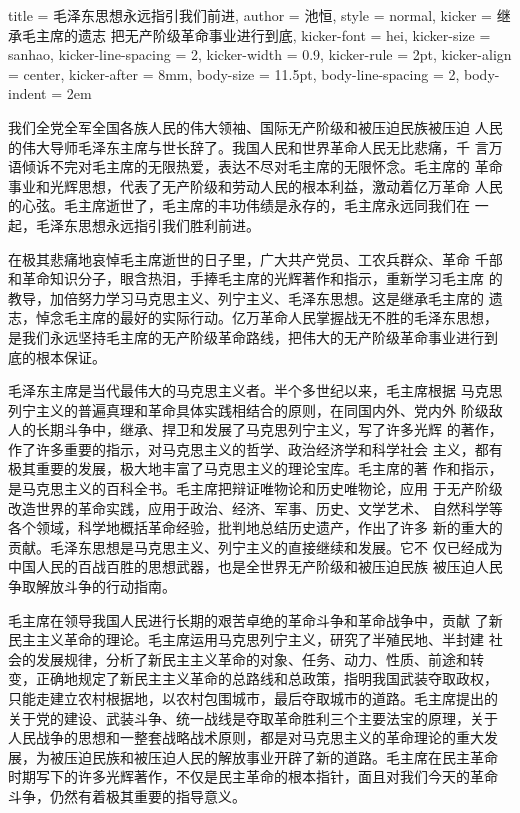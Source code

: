\begin{hongqiarticle}{
        title  = {毛泽东思想永远指引我们前进},
        author = {池恒},
        style  = normal,
        kicker = {继承毛主席的遗志 把无产阶级革命事业进行到底},
        kicker-font = hei,
        kicker-size = sanhao,
        kicker-line-spacing = 2,
        kicker-width = 0.9\textwidth,
        kicker-rule = 2pt,
        kicker-align = center,
        kicker-after = 8mm,
        body-size = 11.5pt,
        body-line-spacing = 2,
        body-indent = 2em
    }
    
    我们全党全军全国各族人民的伟大领袖、国际无产阶级和被压迫民族被压迫
    人民的伟大导师毛泽东主席与世长辞了。我国人民和世界革命人民无比悲痛，千
    言万语倾诉不完对毛主席的无限热爱，表达不尽对毛主席的无限怀念。毛主席的
    革命事业和光辉思想，代表了无产阶级和劳动人民的根本利益，激动着亿万革命
    人民的心弦。毛主席逝世了，毛主席的丰功伟绩是永存的，毛主席永远同我们在
    一起，毛泽东思想永远指引我们胜利前进。
    
    在极其悲痛地哀悼毛主席逝世的日子里，广大共产党员、工农兵群众、革命
    千部和革命知识分子，眼含热泪，手捧毛主席的光辉著作和指示，重新学习毛主席
    的教导，加倍努力学习马克思主义、列宁主义、毛泽东思想。这是继承毛主席的
    遗志，悼念毛主席的最好的实际行动。亿万革命人民掌握战无不胜的毛泽东思想，
    是我们永远坚持毛主席的无产阶级革命路线，把伟大的无产阶级革命事业进行到
    底的根本保证。
    
    毛泽东主席是当代最伟大的马克思主义者。半个多世纪以来，毛主席根据
    马克思列宁主义的普遍真理和革命具体实践相结合的原则，在同国内外、党内外
    阶级敌人的长期斗争中，继承、捍卫和发展了马克思列宁主义，写了许多光辉
    的著作，作了许多重要的指示，对马克思主义的哲学、政治经济学和科学社会
    主义，都有极其重要的发展，极大地丰富了马克思主义的理论宝库。毛主席的著
    作和指示，是马克思主义的百科全书。毛主席把辩证唯物论和历史唯物论，应用
    于无产阶级改造世界的革命实践，应用于政治、经济、军事、历史、文学艺术、
    自然科学等各个领域，科学地概括革命经验，批判地总结历史遗产，作出了许多
    新的重大的贡献。毛泽东思想是马克思主义、列宁主义的直接继续和发展。它不
    仅已经成为中国人民的百战百胜的思想武器，也是全世界无产阶级和被压迫民族
    被压迫人民争取解放斗争的行动指南。
    
    毛主席在领导我国人民进行长期的艰苦卓绝的革命斗争和革命战争中，贡献
    了新民主主义革命的理论。毛主席运用马克思列宁主义，研究了半殖民地、半封建
    社会的发展规律，分析了新民主主义革命的对象、任务、动力、性质、前途和转
    变，正确地规定了新民主主义革命的总路线和总政策，指明我国武装夺取政权，
    只能走建立农村根据地，以农村包围城市，最后夺取城市的道路。毛主席提出的
    关于党的建设、武装斗争、统一战线是夺取革命胜利三个主要法宝的原理，关于
    人民战争的思想和一整套战略战术原则，都是对马克思主义的革命理论的重大发
    展，为被压迫民族和被压迫人民的解放事业开辟了新的道路。毛主席在民主革命
    时期写下的许多光辉著作，不仅是民主革命的根本指针，面且对我们今天的革命
    斗争，仍然有着极其重要的指导意义。
    

\end{hongqiarticle}

